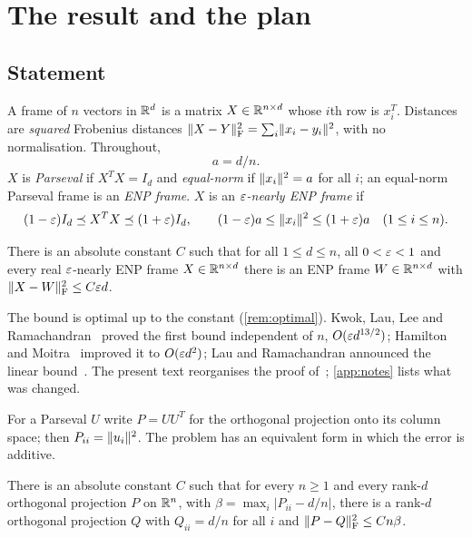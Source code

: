 \section{The result and the plan}\label{sec:intro}

\subsection{Statement}
A frame of $n$ vectors in $\mathbb R^d$ is a matrix $X\in\mathbb R^{n\times d}$ whose $i$th
row is $x_i^T$. Distances are \emph{squared} Frobenius distances
$\lVert X-Y\rVert_{\mathrm F}^2=\sum_i\lVert x_i-y_i\rVert^2$, with no normalisation. Throughout,
\[
 a=d/n .
\]
$X$ is \emph{Parseval} if $X^TX=I_d$ and \emph{equal-norm} if
$\lVert x_i\rVert^2=a$ for all $i$; an equal-norm Parseval frame is an \emph{ENP frame}.
$X$ is an \emph{$\varepsilon$-nearly ENP frame} if
\begin{equation}\label{eq:nearly}
 (1-\varepsilon)I_d\preceq X^TX\preceq(1+\varepsilon)I_d,
 \qquad (1-\varepsilon)a\le\lVert x_i\rVert^2\le(1+\varepsilon)a\quad(1\le i\le n).
\end{equation}

\begin{theorem}\label{thm:main}
There is an absolute constant $C$ such that for all $1\le d\le n$, all
$0<\varepsilon<1$ and every real $\varepsilon$-nearly ENP frame $X\in\mathbb R^{n\times d}$ there is
an ENP frame $W\in\mathbb R^{n\times d}$ with $\lVert X-W\rVert_{\mathrm F}^2\le C\varepsilon d$.
\end{theorem}

The bound is optimal up to the constant (\cref{rem:optimal}). Kwok, Lau, Lee and
Ramachandran~\cite{KLLR} proved the first bound independent of $n$,
$O(\varepsilon d^{13/2})$; Hamilton and Moitra~\cite{HM} improved it to
$O(\varepsilon d^2)$; Lau and Ramachandran announced the linear bound~\cite{LR}. The
present text reorganises the proof of~\cite{Orig}; \cref{app:notes} lists what
was changed.

For a Parseval $U$ write $P=UU^T$ for the orthogonal projection onto its column
space; then $P_{ii}=\lVert u_i\rVert^2$. The problem has an equivalent form in which
the error is additive.

\begin{theorem}\label{thm:projection}
There is an absolute constant $C$ such that for every $n\ge1$ and every
rank-$d$ orthogonal projection $P$ on $\mathbb R^n$, with
$\beta=\max_i|P_{ii}-d/n|$, there is a rank-$d$ orthogonal projection $Q$ with
$Q_{ii}=d/n$ for all $i$ and $\lVert P-Q\rVert_{\mathrm F}^2\le Cn\beta$.
\end{theorem}

